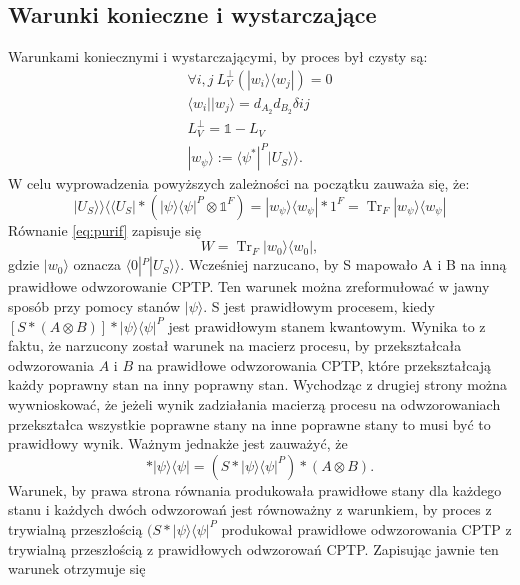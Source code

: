 \documentclass[10pt]{article} %
\DeclareMathOperator{\Trs}{Tr}
\newcommand{\Ket}[1]{|#1\rangle}
\newcommand{\Bra}[1]{\langle#1|}
\newcommand{\BBra}[1]{\langle\langle#1|}
\newcommand{\KKet}[1]{|#1\rangle\rangle}
\newcommand{\KP}{\Ket{\psi}}
\newcommand{\BP}{\Bra{\psi}}
\newcommand{\I}{\mathbb{1}}
\begin{document}
\subsection{Warunki konieczne i wystarczające}
Warunkami koniecznymi i wystarczającymi, by proces był czysty są:
\begin{equation}
\begin{gathered}
\forall i,j ~L^\perp_V\left(\Ket{w_i}\Bra{w_j}\right) = 0 \\
\Bra{w_i}\Ket{w_j} = d_{A_2}d_{B_2}\delta{ij} \\
L^\perp_V = \I - L_V  \\
\Ket{w_\psi} := \Bra{\psi^*}^P \KKet{U_S}.
\end{gathered}
\end{equation} 
W celu wyprowadzenia powyższych zależności na początku zauważa się, że:
\begin{equation}
\KKet{U_S} \BBra{U_S} * (\Ket{\psi}\Bra{\psi}^P \otimes \I^F) = \Ket{w_\psi} \Bra{w_\psi} * 1^F = \Trs_F \Ket{w_\psi} \Bra{w_\psi}
\end{equation}
Równanie \eqref{eq:purif} zapisuje się
\begin{equation}
\label{eq:trpurif}
W = \Trs_F \Ket{w_0}\Bra{w_0},
\end{equation}
gdzie $\Ket{w_0}$ oznacza $\Bra{0}^P\KKet{U_S}$.
Wcześniej narzucano, by S mapowało A i B na inną prawidłowe odwzorowanie CPTP.
Ten warunek można zreformułować w jawny sposób przy pomocy stanów $\Ket{\psi}$.
S jest prawidłowym procesem, kiedy $[ S * (A \otimes B)] * \Ket{\psi}\Bra{\psi}^P$ jest prawidłowym stanem kwantowym. Wynika to z faktu, że narzucony został warunek na macierz procesu, by przekształcała odwzorowania $A$ i $B$ na prawidłowe odwzorowania CPTP, które przekształcają każdy poprawny stan na inny poprawny stan. Wychodząc z drugiej strony można wywnioskować, że jeżeli wynik zadziałania macierzą procesu na odwzorowaniach przekształca wszystkie poprawne stany na inne poprawne stany to musi być to prawidłowy wynik.
Ważnym jednakże jest zauważyć, że
\begin{equation}
[S * (A \otimes B)] * \Ket{\psi}\Bra{\psi} = (S * \KP \BP^P) * (A \otimes B).
\end{equation}
Warunek, by prawa strona równania produkowała prawidłowe stany dla każdego stanu i każdych dwóch odwzorowań jest równoważny z warunkiem, by proces z trywialną przeszłością $(S*\Ket{\psi}\Bra{\psi}^P$ produkował prawidłowe odwzorowania CPTP z trywialną przeszłością z prawidłowych odwzorowań CPTP.
Zapisując jawnie ten warunek otrzymuje się
\end{document}
